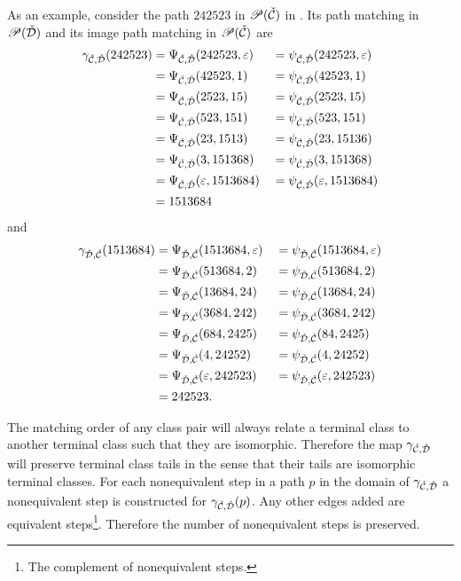 As an example, consider the path $242523$ in $\mathscr{P}(\check{\mathcal{C}})$ in . Its path matching in $\mathscr{P}(\check{\mathcal{D}})$ and its image path matching in $\mathscr{P}(\check{\mathcal{C}})$ are
\begin{alignat*}{3}
    \gamma_{\check{\mathcal{C}},\check{\mathcal{D}}}(242523) &= \Psi_{\check{\mathcal{C}},\check{\mathcal{D}}}(242523, \varepsilon) &&= \psi_{\check{\mathcal{C}},\check{\mathcal{D}}}(242523, \varepsilon)\\
    &= \Psi_{\check{\mathcal{C}},\check{\mathcal{D}}}(42523,1) &&= \psi_{\check{\mathcal{C}},\check{\mathcal{D}}}(42523,1)\\
    &= \Psi_{\check{\mathcal{C}},\check{\mathcal{D}}}(2523,15) &&= \psi_{\check{\mathcal{C}},\check{\mathcal{D}}}(2523,15)\\
    &= \Psi_{\check{\mathcal{C}},\check{\mathcal{D}}}(523,151) &&= \psi_{\check{\mathcal{C}},\check{\mathcal{D}}}(523,151)\\
    &= \Psi_{\check{\mathcal{C}},\check{\mathcal{D}}}(23,1513) &&= \psi_{\check{\mathcal{C}},\check{\mathcal{D}}}(23,15136)\\
    &= \Psi_{\check{\mathcal{C}},\check{\mathcal{D}}}(3,151368) &&= \psi_{\check{\mathcal{C}},\check{\mathcal{D}}}(3,151368)\\
    &= \Psi_{\check{\mathcal{C}},\check{\mathcal{D}}}(\varepsilon,1513684) &&= \psi_{\check{\mathcal{C}},\check{\mathcal{D}}}(\varepsilon,1513684)\\
    &= 1513684
\end{alignat*}
and
\begin{alignat*}{3}
    \gamma_{\check{\mathcal{D}},\check{\mathcal{C}}}(1513684) &= \Psi_{\check{\mathcal{D}},\check{\mathcal{C}}}(1513684, \varepsilon) &&= \psi_{\check{\mathcal{D}},\check{\mathcal{C}}}(1513684, \varepsilon)\\
    &= \Psi_{\check{\mathcal{D}},\check{\mathcal{C}}}(513684, 2) &&= \psi_{\check{\mathcal{D}},\check{\mathcal{C}}}(513684, 2)\\
    &= \Psi_{\check{\mathcal{D}},\check{\mathcal{C}}}(13684, 24) &&= \psi_{\check{\mathcal{D}},\check{\mathcal{C}}}(13684, 24)\\
    &= \Psi_{\check{\mathcal{D}},\check{\mathcal{C}}}(3684, 242) &&= \psi_{\check{\mathcal{D}},\check{\mathcal{C}}}(3684, 242)\\
    &= \Psi_{\check{\mathcal{D}},\check{\mathcal{C}}}(684, 2425) &&= \psi_{\check{\mathcal{D}},\check{\mathcal{C}}}(84, 2425)\\
    &= \Psi_{\check{\mathcal{D}},\check{\mathcal{C}}}(4, 24252) &&= \psi_{\check{\mathcal{D}},\check{\mathcal{C}}}(4, 24252)\\
    &= \Psi_{\check{\mathcal{D}},\check{\mathcal{C}}}(\varepsilon, 242523) &&= \psi_{\check{\mathcal{D}},\check{\mathcal{C}}}(\varepsilon, 242523)\\
    &= 242523.
\end{alignat*}

The matching order of any class pair will always relate a terminal class to another terminal class such that they are isomorphic. Therefore the map $\gamma_{\check{\mathcal{C}},\check{\mathcal{D}}}$ will preserve terminal class tails in the sense that their tails are isomorphic terminal classes. For each nonequivalent step in a path $p$ in the domain of $\gamma_{\check{\mathcal{C}},\check{\mathcal{D}}}$ a nonequivalent step is constructed for $\gamma_{\check{\mathcal{C}},\check{\mathcal{D}}}(p)$. Any other edges added are equivalent steps\footnote{The complement of nonequivalent steps.}. Therefore the number of nonequivalent steps is preserved.

